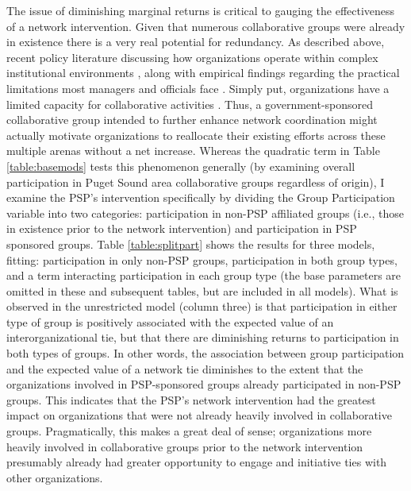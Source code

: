 \documentclass[12pt,a4paper,titlepage]{article}
\begin{document}


The issue of diminishing marginal returns is critical to gauging the effectiveness of a network intervention. Given that numerous collaborative groups were already in existence there is a very real potential for redundancy. As described above, recent policy literature discussing how organizations operate within complex institutional environments \parencite[see][]{lubell2013}, along with empirical findings regarding the practical limitations most managers and officials face \parencite{thomas2003,margerum2011}. Simply put, organizations have a limited capacity for collaborative activities \parencite{lubell2010}. Thus, a government-sponsored collaborative group intended to further enhance network coordination might actually motivate organizations to reallocate their existing efforts across these multiple arenas without a net increase. Whereas the quadratic term in Table \ref{table:basemods} tests this phenomenon generally (by examining overall participation in Puget Sound area collaborative groups regardless of origin), I examine the PSP's intervention specifically by dividing the Group Participation variable into two categories: participation in non-PSP affiliated groups (i.e., those in existence prior to the network intervention) and participation in PSP sponsored groups. Table \ref{table:splitpart} shows the results for three models, fitting: participation in only non-PSP groups, participation in both group types, and a term interacting participation in each group type (the base parameters are omitted in these and subsequent tables, but are included in all models). What is observed in the unrestricted model (column three) is that participation in either type of group is positively associated with the expected value of an interorganizational tie, but that there are diminishing returns to participation in both types of groups. In other words, the association between group participation and the expected value of a network tie diminishes to the extent that the organizations involved in PSP-sponsored groups already participated in non-PSP groups. This indicates that the PSP's network intervention had the greatest impact on organizations that were not already heavily involved in collaborative groups. Pragmatically, this makes a great deal of sense; organizations more heavily involved in collaborative groups prior to the network intervention presumably already had greater opportunity to engage and initiative ties with other organizations.
\end{document}

